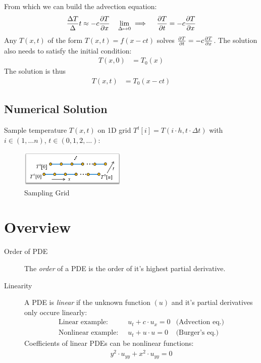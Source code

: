 \begin{multicols}{2}
From which we can build the advection equation:
\begin{align*}
	{\Delta T  \over \Delta} t \approx -c {\partial T \over \partial x} \quad
	\lim_{\Delta \mapsto 0} \implies \quad {\partial T \over \partial t} = -c {\partial T \over \partial x}
\end{align*}
Any $T(x,t)$ of the form $T(x,t) = f(x-ct)$ solves ${\partial T \over \partial t} = -c {\partial T \over \partial x}$.  The solution also needs to satisfy the initial condition:
	\begin{align*}
		T(x,0) &= T_0(x)
	\end{align*}
	The solution is thus
	\begin{align*}
		T(x, t) &= T_0(x-ct)
	\end{align*}

\subsection{Numerical Solution}
Sample temperature $T(x,t)$ on 1D grid $T^t[i] = T(i\cdot h, t\cdot \Delta t)$ with $i \in (1,\ldots n)$, $t \in (0,1,2, \ldots)$:
\begin{figure}[H]
	\centering
	\includegraphics[width=0.45\textwidth]{img/03_numerical_solution}
	\caption{Sampling Grid}
\end{figure}

\section{Overview}
\begin{description}
	\item[Order of PDE] The \emph{order} of a PDE is the order of it's highest partial derivative.
	\item[Linearity] A PDE is \emph{linear} if the unknown function $(u)$ and it's partial derivatives only occure linearly:
		\begin{align*}
			\text{Linear example: }\ & u_t+c\cdot u_x = 0 & \text{(Advection eq.)}\\
			\text{Nonlinear example: }\ & u_t+u\cdot u = 0 & \text{(Burger's eq.)}
		\end{align*}
		Coefficients of linear PDEs can be nonlinear functions:
		\begin{align*}
			y^2 \cdot u_{yy} + x^2 \cdot u_{yy} = 0
		\end{align*}



\end{description}
\end{multicols}
